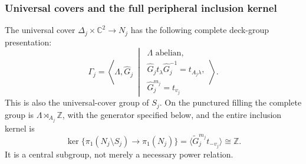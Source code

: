 \subsubsection{Universal covers and the full peripheral inclusion kernel}

\begin{theorem}
\label{ffcert:thm:peripheral-kernel}
The universal cover $\Delta_j\times\mathbb C^2\to N_j$ has the
following complete deck-group presentation:
\[
 \Gamma_j=\left\langle\Lambda,\widehat G_j\ \middle|\
 \begin{array}{l}
 \Lambda\text{ abelian},\\
 \widehat G_jt_\lambda\widehat G_j^{-1}=t_{A_j\lambda},\\
 \widehat G_j^{m_j}=t_{v_j}
 \end{array}\right\rangle.
 \tag{FF30}\label{ffcert:eq:full-deck-group}
\]
This is also the universal-cover group of $S_j$. On the punctured
filling the complete group is $\Lambda\rtimes_{A_j}\mathbb Z$,
with the generator specified below, and the entire inclusion kernel is
\[
 \ker\{\pi_1(N_j\setminus S_j)\to\pi_1(N_j)\}
   =\langle\widetilde G_j^{m_j}t_{-v_j}\rangle
   \cong\mathbb Z.
 \tag{FF31}\label{ffcert:eq:whole-kernel}
\]
It is a central subgroup, not merely a necessary power relation.
\end{theorem}

